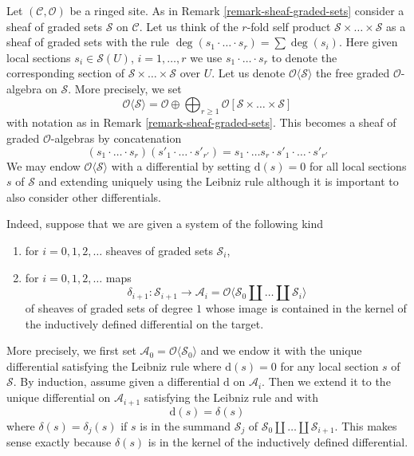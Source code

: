 \medskip\noindent
Let $(\mathcal{C}, \mathcal{O})$ be a ringed site. As in
Remark \ref{remark-sheaf-graded-sets} consider a
sheaf of graded sets $\mathcal{S}$ on $\mathcal{C}$.
Let us think of the $r$-fold self product
$\mathcal{S} \times \ldots \times \mathcal{S}$
as a sheaf of graded sets with the rule
$\deg(s_1 \cdot \ldots \cdot s_r) = \sum \deg(s_i)$.
Here given local sections $s_i \in \mathcal{S}(U)$, $i = 1, \ldots, r$
we use $s_1 \cdot \ldots \cdot s_r$
to denote the corresponding section of
$\mathcal{S} \times \ldots \times \mathcal{S}$
over $U$. Let us denote $\mathcal{O}\langle \mathcal{S} \rangle$
the free graded $\mathcal{O}$-algebra on $\mathcal{S}$.
More precisely, we set
$$
\mathcal{O}\langle \mathcal{S} \rangle =
\mathcal{O} \oplus
\bigoplus\nolimits_{r \geq 1}
\mathcal{O}[\mathcal{S} \times \ldots \times \mathcal{S}]
$$
with notation as in Remark \ref{remark-sheaf-graded-sets}.
This becomes a sheaf of graded $\mathcal{O}$-algebras by
concatenation
$$
(s_1 \cdot \ldots \cdot s_r)  (s'_1 \cdot \ldots \cdot s'_{r'}) =
s_1 \cdot \ldots s_r \cdot s'_1 \cdot \ldots \cdot s'_{r'}
$$
We may endow $\mathcal{O}\langle \mathcal{S} \rangle$
with a differential by setting $\text{d}(s) = 0$
for all local sections $s$ of $\mathcal{S}$
and extending uniquely using the Leibniz rule
although it is important to also consider other differentials.

\medskip\noindent
Indeed, suppose that we are given a system of the following kind
\begin{enumerate}
\item for $i = 0, 1, 2, \ldots$ sheaves of graded sets $\mathcal{S}_i$,
\item for $i = 0, 1, 2, \ldots$ maps
$$
\delta_{i + 1} : \mathcal{S}_{i + 1}
\longrightarrow
\mathcal{A}_i =
\mathcal{O}\langle \mathcal{S}_0 \amalg \ldots \amalg \mathcal{S}_i\rangle
$$
of sheaves of graded sets of degree $1$ whose image is contained
in the kernel of the inductively defined differential on the target.
\end{enumerate}
More precisely, we first set
$\mathcal{A}_0 = \mathcal{O}\langle \mathcal{S}_0 \rangle$
and we endow it with the unique differential satisfying the Leibniz rule
where $\text{d}(s) = 0$ for any local section $s$ of $\mathcal{S}$.
By induction, assume given a differential $\text{d}$
on $\mathcal{A}_i$. Then we extend it to the unique
differential on $\mathcal{A}_{i + 1}$ satisfying the Leibniz rule and
with
$$
\text{d}(s) = \delta(s)
$$
where $\delta(s) = \delta_j(s)$ if $s$ is in the summand $\mathcal{S}_j$ of
$\mathcal{S}_0 \amalg \ldots \amalg \mathcal{S}_{i + 1}$.
This makes sense exactly because $\delta(s)$ is in the kernel
of the inductively defined differential.

